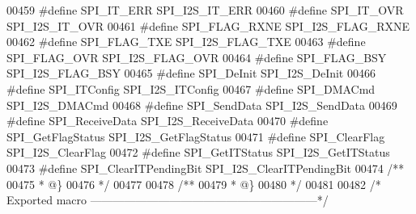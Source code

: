 \begin{DoxyCode}
00459 \textcolor{preprocessor}{#}\textcolor{preprocessor}{define} \textcolor{preprocessor}{SPI\_IT\_ERR}                   SPI_I2S_IT_ERR
00460 \textcolor{preprocessor}{#}\textcolor{preprocessor}{define} \textcolor{preprocessor}{SPI\_IT\_OVR}                   SPI_I2S_IT_OVR
00461 \textcolor{preprocessor}{#}\textcolor{preprocessor}{define} \textcolor{preprocessor}{SPI\_FLAG\_RXNE}                SPI_I2S_FLAG_RXNE
00462 \textcolor{preprocessor}{#}\textcolor{preprocessor}{define} \textcolor{preprocessor}{SPI\_FLAG\_TXE}                 SPI_I2S_FLAG_TXE
00463 \textcolor{preprocessor}{#}\textcolor{preprocessor}{define} \textcolor{preprocessor}{SPI\_FLAG\_OVR}                 SPI_I2S_FLAG_OVR
00464 \textcolor{preprocessor}{#}\textcolor{preprocessor}{define} \textcolor{preprocessor}{SPI\_FLAG\_BSY}                 SPI_I2S_FLAG_BSY
00465 \textcolor{preprocessor}{#}\textcolor{preprocessor}{define} \textcolor{preprocessor}{SPI\_DeInit}                   \textcolor{preprocessor}{SPI\_I2S\_DeInit}
00466 \textcolor{preprocessor}{#}\textcolor{preprocessor}{define} \textcolor{preprocessor}{SPI\_ITConfig}                 \textcolor{preprocessor}{SPI\_I2S\_ITConfig}
00467 \textcolor{preprocessor}{#}\textcolor{preprocessor}{define} \textcolor{preprocessor}{SPI\_DMACmd}                   \textcolor{preprocessor}{SPI\_I2S\_DMACmd}
00468 \textcolor{preprocessor}{#}\textcolor{preprocessor}{define} \textcolor{preprocessor}{SPI\_SendData}                 \textcolor{preprocessor}{SPI\_I2S\_SendData}
00469 \textcolor{preprocessor}{#}\textcolor{preprocessor}{define} \textcolor{preprocessor}{SPI\_ReceiveData}              \textcolor{preprocessor}{SPI\_I2S\_ReceiveData}
00470 \textcolor{preprocessor}{#}\textcolor{preprocessor}{define} \textcolor{preprocessor}{SPI\_GetFlagStatus}            \textcolor{preprocessor}{SPI\_I2S\_GetFlagStatus}
00471 \textcolor{preprocessor}{#}\textcolor{preprocessor}{define} \textcolor{preprocessor}{SPI\_ClearFlag}                \textcolor{preprocessor}{SPI\_I2S\_ClearFlag}
00472 \textcolor{preprocessor}{#}\textcolor{preprocessor}{define} \textcolor{preprocessor}{SPI\_GetITStatus}              \textcolor{preprocessor}{SPI\_I2S\_GetITStatus}
00473 \textcolor{preprocessor}{#}\textcolor{preprocessor}{define} \textcolor{preprocessor}{SPI\_ClearITPendingBit}        \textcolor{preprocessor}{SPI\_I2S\_ClearITPendingBit}
00474 \textcolor{comment}{/**}
00475 \textcolor{comment}{  * @\}}
00476 \textcolor{comment}{  */}
00477 
00478 \textcolor{comment}{/**}
00479 \textcolor{comment}{  * @\}}
00480 \textcolor{comment}{  */}
00481 
00482 \textcolor{comment}{/* Exported macro ------------------------------------------------------------*/}

\end{DoxyCode}
